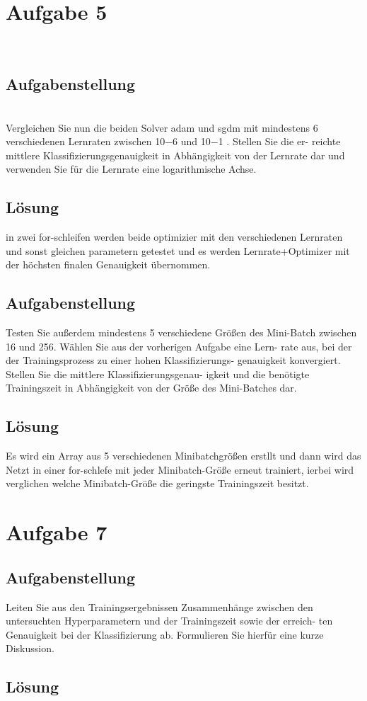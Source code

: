 \documentclass[8pt,a4paper]{article}
\begin{document}
\section{Aufgabe 5}
\\
\subsection{Aufgabenstellung}
\\
Vergleichen Sie nun die beiden Solver adam und sgdm mit mindestens 6
verschiedenen Lernraten zwischen 10−6 und 10−1 . Stellen Sie die er-
reichte mittlere Klassifizierungsgenauigkeit in Abhängigkeit von der
Lernrate dar und verwenden Sie für die Lernrate eine logarithmische
Achse.
\\
\subsection{Lösung}
in zwei for-schleifen werden beide optimizier mit den verschiedenen Lernraten und sonst gleichen parametern getestet und es werden Lernrate+Optimizer mit der höchsten finalen Genauigkeit übernommen.



\subsection{Aufgabenstellung}
Testen Sie außerdem mindestens 5 verschiedene Größen des Mini-Batch
zwischen 16 und 256. Wählen Sie aus der vorherigen Aufgabe eine Lern-
rate aus, bei der der Trainingsprozess zu einer hohen Klassifizierungs-
genauigkeit konvergiert. Stellen Sie die mittlere Klassifizierungsgenau-
igkeit und die benötigte Trainingszeit in Abhängigkeit von der Größe
des Mini-Batches dar.
\\

\subsection{Lösung}
Es wird ein Array aus 5 verschiedenen Minibatchgrößen erstllt und dann wird das Netzt in einer for-schlefe mit jeder Minibatch-Größe erneut trainiert, ierbei wird verglichen welche Minibatch-Größe die geringste Trainingszeit besitzt.



\section{Aufgabe 7}
\subsection{Aufgabenstellung}
Leiten Sie aus den Trainingsergebnissen Zusammenhänge zwischen den
untersuchten Hyperparametern und der Trainingszeit sowie der erreich-
ten Genauigkeit bei der Klassifizierung ab. Formulieren Sie hierfür eine
kurze Diskussion.
\subsection{Lösung}
\end{document}
